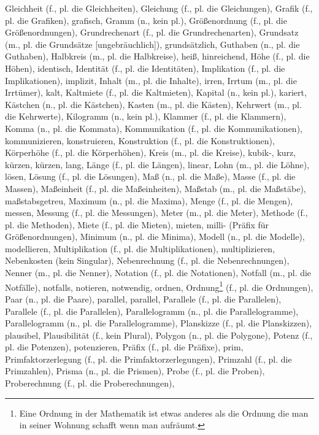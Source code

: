 Gleichheit (f., pl. die Gleichheiten),
Gleichung (f., pl. die Gleichungen),
Grafik (f., pl. die Grafiken),
grafisch,
Gramm (n., kein pl.),
Größenordnung (f., pl. die Größenordnungen),
Grundrechenart (f., pl. die Grundrechenarten),
Grundsatz (m., pl. die Grundsätze [ungebräuchlich]),
grundsätzlich,
Guthaben (n., pl. die Guthaben),
Halbkreis (m., pl. die Halbkreise),
heiß,
hinreichend,
Höhe (f., pl. die Höhen),
identisch,
Identität (f., pl. die Identitäten),
Implikation (f., pl. die Implikationen),
implizit,
Inhalt (m., pl. die Inhalte),
irren,
Irrtum (m., pl. die Irrtümer),
kalt,
Kaltmiete (f., pl. die Kaltmieten),
Kapital (n., kein pl.),
kariert,
Kästchen (n., pl. die Kästchen),
Kasten (m., pl. die Kästen),
Kehrwert (m., pl. die Kehrwerte),
Kilogramm (n., kein pl.),
Klammer (f., pl. die Klammern),
Komma (n., pl. die Kommata),
Kommunikation (f., pl. die Kommunikationen),
kommunizieren,
konstruieren,
Konstruktion (f., pl. die Konstruktionen),
Körperhöhe (f., pl. die Körperhöhen),
Kreis (m., pl. die Kreise),
kubik-,
kurz,
kürzen,
kürzen,
lang,
Länge (f., pl. die Längen),
linear,
Lohn (m., pl. die Löhne),
lösen,
Lösung (f., pl. die Lösungen),
Maß (n., pl. die Maße),
Masse (f., pl. die Massen),
Maßeinheit (f., pl. die Maßeinheiten),
Maßstab (m., pl. die Maßstäbe),
maßstabsgetreu,
Maximum (n., pl. die Maxima),
Menge (f., pl. die Mengen),
messen,
Messung (f., pl. die Messungen),
Meter (m., pl. die Meter),
Methode (f., pl. die Methoden),
Miete (f., pl. die Mieten),
mieten,
milli- (Präfix für Größenordnungen),
Minimum (n., pl. die Minima),
Modell (n., pl. die Modelle),
modellieren,
Multiplikation (f., pl. die Multiplikationen),
multiplizieren,
Nebenkosten (kein Singular),
Nebenrechnung (f., pl. die Nebenrechnungen),
Nenner (m., pl. die Nenner),
Notation (f., pl. die Notationen),
Notfall (m., pl. die Notfälle),
notfalls,
notieren,
notwendig,
ordnen,
Ordnung\footnote{Eine Ordnung in der Mathematik ist etwas anderes als die Ordnung die man in seiner Wohnung schafft wenn man aufräumt.} (f., pl. die Ordnungen),
Paar (n., pl. die Paare),
parallel,
parallel,
Parallele (f., pl. die Parallelen),
Parallele (f., pl. die Parallelen),
Parallelogramm (n., pl. die Parallelogramme),
Parallelogramm (n., pl. die Parallelogramme),
Planskizze (f., pl. die Planskizzen),
plausibel,
Plausibilität (f., kein Plural),
Polygon (n., pl. die Polygone),
Potenz (f., pl. die Potenzen),
potenzieren,
Präfix (f., pl. die Präfixe),
prim,
Primfaktorzerlegung (f., pl. die Primfaktorzerlegungen),
Primzahl (f., pl. die Primzahlen),
Prisma (n., pl. die Prismen),
Probe (f., pl. die Proben),
Proberechnung (f., pl. die Proberechnungen),
